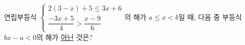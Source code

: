 연립부등식 $\begin{cases} 2(3-x)+5\le 3x+6 \\ \dfrac{-3x+5}{4}>\dfrac{x-9}{6} \end{cases}$의 해가 $a\le x<b$일 때, 다음 중 부등식 $bx-a<0$의 해가 \underline{아닌} 것은?
